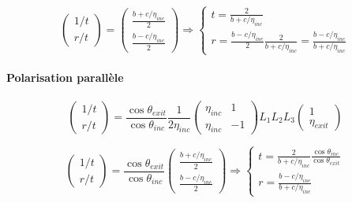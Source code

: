 \documentclass[a4paper,english]{article}
\begin{document}
\begin{dmath}
\begin{pmatrix}1/t \\ r/t \end{pmatrix} = \begin{pmatrix} \frac{b + c / \eta_{inc}}{2} \\ \frac{b - c / \eta_{inc}}{2} \end{pmatrix} \Rightarrow
\left\{ \begin{array}{l}
	t = \frac{2}{b + c / \eta_{inc}} \\
	r = \frac{b - c / \eta_{inc}}{2} \frac{2}{b + c / \eta_{inc}} = \frac{b - c / \eta_{inc}}{b + c / \eta_{inc}}
\end{array} \right.
\end{dmath}


\paragraph{Polarisation parallèle}
\begin{dmath}
\begin{pmatrix}1/t \\ r/t \end{pmatrix} = \frac{\cos \theta_{exit}}{\cos \theta_{inc}} \frac{1}{2 \eta_{inc}} \begin{pmatrix} \eta_{inc} & 1 \\ \eta_{inc} & -1 \end{pmatrix} L_1 L_2 L_3 \begin{pmatrix} 1 \\ \eta_{exit} \end{pmatrix}
\end{dmath}

\begin{dmath}
\begin{pmatrix}1/t \\ r/t \end{pmatrix} =  \frac{\cos \theta_{exit}}{\cos \theta_{inc}} \begin{pmatrix} \frac{b + c / \eta_{inc}}{2} \\ \frac{b - c / \eta_{inc}}{2} \end{pmatrix} \Rightarrow
\left\{ \begin{array}{l}
	t = \frac{2}{b + c / \eta_{inc}} \frac{\cos \theta_{inc}}{\cos \theta_{exit}} \\
	r = \frac{b - c / \eta_{inc}}{b + c / \eta_{inc}}
\end{array} \right.
\end{dmath}
\end{document}
